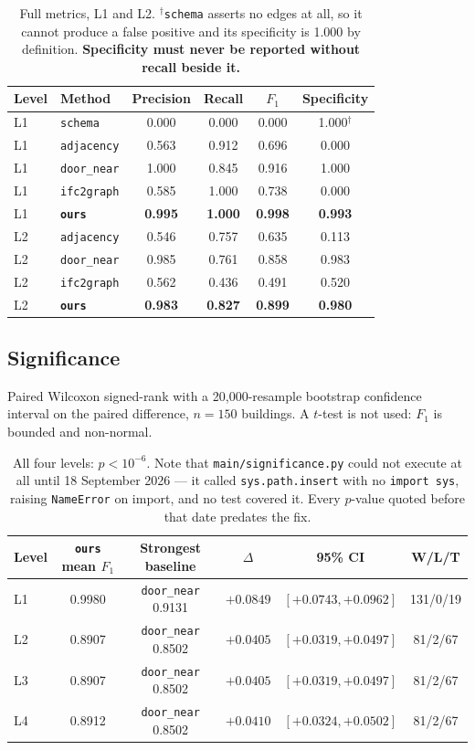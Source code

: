 \documentclass[11pt,a4paper]{article}
\newcommand{\code}[1]{\texttt{\small #1}}
\begin{document}
\begin{table}[ht]
\centering
\small
\begin{tabular}{llcccc}
\toprule
Level & Method & Precision & Recall & $F_1$ & \textbf{Specificity} \\
\midrule
L1 & \code{schema}    & 0.000 & 0.000 & 0.000 & 1.000$^{\dagger}$ \\
L1 & \code{adjacency} & 0.563 & 0.912 & 0.696 & 0.000 \\
L1 & \code{door\_near} & 1.000 & 0.845 & 0.916 & 1.000 \\
L1 & \code{ifc2graph} & 0.585 & 1.000 & 0.738 & 0.000 \\
L1 & \textbf{\code{ours}} & \textbf{0.995} & \textbf{1.000} & \textbf{0.998} & \textbf{0.993} \\
\midrule
L2 & \code{adjacency} & 0.546 & 0.757 & 0.635 & 0.113 \\
L2 & \code{door\_near} & 0.985 & 0.761 & 0.858 & 0.983 \\
L2 & \code{ifc2graph} & 0.562 & 0.436 & 0.491 & 0.520 \\
L2 & \textbf{\code{ours}} & \textbf{0.983} & \textbf{0.827} & \textbf{0.899} & \textbf{0.980} \\
\bottomrule
\end{tabular}
\caption{Full metrics, L1 and L2. $^{\dagger}$\code{schema} asserts no edges at
all, so it cannot produce a false positive and its specificity is 1.000 by
definition. \textbf{Specificity must never be reported without recall beside
it.}}
\end{table}

\subsection{Significance}

Paired Wilcoxon signed-rank with a 20{,}000-resample bootstrap confidence
interval on the paired difference, $n=150$ buildings. A $t$-test is not used:
$F_1$ is bounded and non-normal.

\begin{table}[ht]
\centering
\small
\begin{tabular}{lccccc}
\toprule
Level & \code{ours} mean $F_1$ & Strongest baseline & $\Delta$ & 95\% CI & W/L/T \\
\midrule
L1 & 0.9980 & \code{door\_near} 0.9131 & $+0.0849$ & $[+0.0743,+0.0962]$ & 131/0/19 \\
L2 & 0.8907 & \code{door\_near} 0.8502 & $+0.0405$ & $[+0.0319,+0.0497]$ & 81/2/67 \\
L3 & 0.8907 & \code{door\_near} 0.8502 & $+0.0405$ & $[+0.0319,+0.0497]$ & 81/2/67 \\
L4 & 0.8912 & \code{door\_near} 0.8502 & $+0.0410$ & $[+0.0324,+0.0502]$ & 81/2/67 \\
\bottomrule
\end{tabular}
\caption{All four levels: $p<10^{-6}$. Note that \code{main/significance.py}
could not execute at all until 18 September 2026 --- it called
\code{sys.path.insert} with no \code{import sys}, raising \code{NameError} on
import, and no test covered it. Every $p$-value quoted before that date
predates the fix.}
\end{table}
\end{document}
